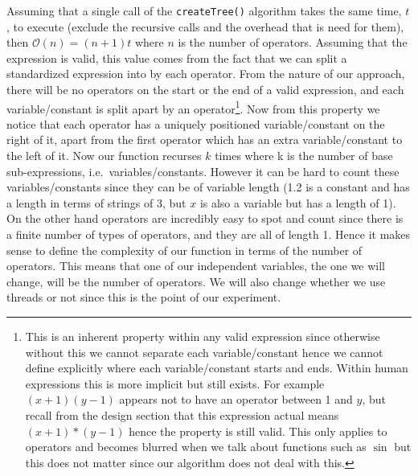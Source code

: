 \documentclass[../../../../../main.tex]{subfiles}
\begin{document}
Assuming that a single call of the \texttt{createTree()} algorithm takes the same time, $t$, to execute (exclude the recursive calls and the overhead that is need for them), then $\mathcal{O}(n) = (n+1)t$ where $n$ is the number of operators. Assuming that the expression is valid, this value comes from the fact that we can split a standardized expression into by each operator. From the nature of our approach, there will be no operators on the start or the end of a valid expression, and each variable/constant is split apart by an operator\footnote{This is an inherent property within any valid expression since otherwise without this we cannot separate each variable/constant hence we cannot define explicitly where each variable/constant starts and ends. Within human expressions this is more implicit but still exists. For example $(x+1)(y-1)$ appears not to have an operator between 1 and $y$, but recall from the design section that this expression actual means $(x+1)*(y-1)$ hence the property is still valid. This only applies to operators and becomes blurred when we talk about functions such as $\sin$ but this does not matter since our algorithm does not deal with this.}. 
Now from this property we notice that each operator has a uniquely positioned variable/constant on the right of it, apart from the first operator which has an extra variable/constant to the left of it. Now our function recurses $k$ times where k is the number of base sub-expressions, i.e.\ variables/constants. However it can be hard to count these variables/constants since they can be of variable length (1.2 is a constant and has a length in terms of strings of 3, but $x$ is also a variable but has a length of 1). On the other hand operators are incredibly easy to spot and count since there is a finite number of types of operators, and they are all of length 1. Hence it makes sense to define the complexity of our function in terms of the number of operators. This means that one of our independent variables, the one we will change, will be the number of operators. We will also change whether we use threads or not since this is the point of our experiment.
 
\end{document}
